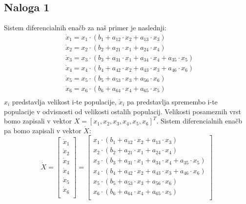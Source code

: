 \documentclass[a4paper, 12pt]{article}
\begin{document}
\subsection{Naloga 1}
Sistem diferencialnih enačb za naš primer je naslednji:
\begin{align*}
	&\dot x_{1} = x_{1}\cdot(b_{1}+a_{12}\cdot x_{2}+a_{13}\cdot x_{3}) \\
	&\dot x_{2} = x_{2}\cdot(b_{2}+a_{21}\cdot x_{1}+a_{24}\cdot x_{4}) \\
	&\dot x_{3} = x_{3}\cdot(b_{3}+a_{31}\cdot x_{1}+a_{34}\cdot x_{4}+a_{35}\cdot x_{5}) \\
	&\dot x_{4} = x_{4}\cdot(b_{4}+a_{42}\cdot x_{2}+a_{43}\cdot x_{3}+a_{46}\cdot x_{6}) \\
	&\dot x_{5} = x_{5}\cdot(b_{5}+a_{53}\cdot x_{3}+a_{56}\cdot x_{6}) \\
	&\dot x_{6} = x_{6}\cdot(b_{6}+a_{64}\cdot x_{4}+a_{65}\cdot x_{5}) \\
\end{align*}
$ x_{i} $ predstavlja velikost i-te populacije, $ \dot x_{i} $ pa predstavlja spremembo
i-te populacije v odvisnosti od velikosti ostalih populacij. Velikosti posameznih vrst
bomo zapisali v vektor $ X = \left[x_{1}, x_{2}, x_{3}, x_{4}, x_{5}, x_{6}\right]^{T} $.
Sistem diferencialnih enačb pa bomo zapisali v vektor $ \dot X $:
\begin{equation}
	\dot X =
	\begin{bmatrix}
		\dot x_{1} \\
		\dot x_{2} \\
		\dot x_{3} \\
		\dot x_{4} \\
		\dot x_{5} \\
		\dot x_{6} \\
	\end{bmatrix}
	=
	\begin{bmatrix}
		x_{1}\cdot(b_{1}+a_{12}\cdot x_{2}+a_{13}\cdot x_{3}) \\
		x_{2}\cdot(b_{2}+a_{21}\cdot x_{1}+a_{24}\cdot x_{4}) \\
		x_{3}\cdot(b_{3}+a_{31}\cdot x_{1}+a_{34}\cdot x_{4}+a_{35}\cdot x_{5}) \\
		x_{4}\cdot(b_{4}+a_{42}\cdot x_{2}+a_{43}\cdot x_{3}+a_{46}\cdot x_{6}) \\
		x_{5}\cdot(b_{5}+a_{53}\cdot x_{3}+a_{56}\cdot x_{6}) \\
		x_{6}\cdot(b_{6}+a_{64}\cdot x_{4}+a_{65}\cdot x_{5}) \\
	\end{bmatrix}
\end{equation}
\end{document}
